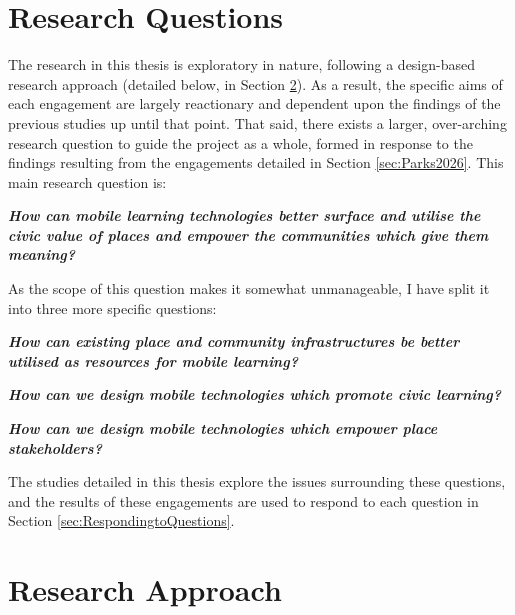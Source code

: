 \section{Research Questions}

The research in this thesis is exploratory in nature, following a design-based research approach (detailed below, in Section \ref{sec:ResearchApproach}). As a result, the specific aims of each engagement are largely reactionary and dependent upon the findings of the previous studies up until that point. That said, there exists a larger, over-arching research question to guide the project as a whole, formed in response to the findings resulting from the engagements detailed in Section \ref{sec:Parks2026}. This main research question is:

\begin{displayquote}
\textit{\textbf{How can mobile learning technologies better surface and utilise the civic value of places and empower the communities which give them meaning?}}
\end{displayquote}

As the scope of this question makes it somewhat unmanageable, I have split it into three more specific questions:

\begin{displayquote}
\textit{\textbf{How can existing place and community infrastructures be better utilised as resources for mobile learning?}}
\end{displayquote}

\begin{displayquote}
\textit{\textbf{How can we design mobile technologies which promote civic learning?}}
\end{displayquote}

\begin{displayquote}
\textit{\textbf{How can we design mobile technologies which empower place stakeholders?}}
\end{displayquote}

The studies detailed in this thesis explore the issues surrounding these questions, and the results of these engagements are used to respond to each question in Section \ref{sec:RespondingtoQuestions}.

\section{Research Approach}
\label{sec:ResearchApproach}

